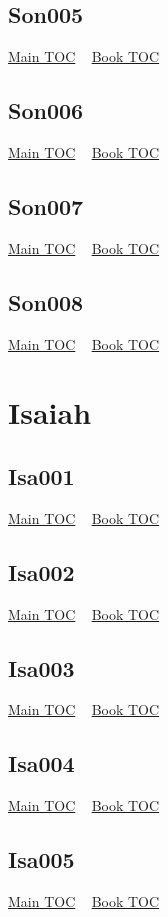 \documentclass{book}
\begin{document}
  \section{Son005}\hyperlink{toc}{Main TOC} ~ \hyperref[subsec:Son]{Book TOC} 
  \section{Son006}\hyperlink{toc}{Main TOC} ~ \hyperref[subsec:Son]{Book TOC} 
  \section{Son007}\hyperlink{toc}{Main TOC} ~ \hyperref[subsec:Son]{Book TOC} 
  \section{Son008}\hyperlink{toc}{Main TOC} ~ \hyperref[subsec:Son]{Book TOC} 
  \chapter{Isaiah} \label{subsec:Isa} \begin{multicols}{2} \minitoc \end{multicols}
  \section{Isa001}\hyperlink{toc}{Main TOC} ~ \hyperref[subsec:Isa]{Book TOC} 
  \section{Isa002}\hyperlink{toc}{Main TOC} ~ \hyperref[subsec:Isa]{Book TOC} 
  \section{Isa003}\hyperlink{toc}{Main TOC} ~ \hyperref[subsec:Isa]{Book TOC} 
  \section{Isa004}\hyperlink{toc}{Main TOC} ~ \hyperref[subsec:Isa]{Book TOC} 
  \section{Isa005}\hyperlink{toc}{Main TOC} ~ \hyperref[subsec:Isa]{Book TOC} 
\end{document}
